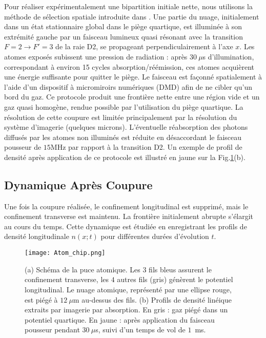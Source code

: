 Pour réaliser expérimentalement une bipartition initiale nette, nous utilisons la méthode de sélection spatiale introduite dans \cite{PhysRevLett.133.113402}. Une partie du nuage, initialement dans un état stationnaire global dans le piège quartique, est illuminée à son extrémité gauche par un faisceau lumineux quasi résonant avec la transition $F=2 \rightarrow F'=3$ de la raie D2, se propageant perpendiculairement à l’axe $x$. Les atomes exposés subissent une pression de radiation : après $30~\mu$s d’illumination, correspondant à environ 15 cycles absorption/réémission, ces atomes acquièrent une énergie suffisante pour quitter le piège. Le faisceau est façonné spatialement à l’aide d’un dispositif à micromiroirs numériques (DMD) afin de ne cibler qu’un bord du gaz. Ce protocole produit une frontière nette entre une région vide et un gaz quasi homogène, rendue possible par l’utilisation du piège quartique. La résolution de cette coupure est limitée principalement par la résolution du système d’imagerie (quelques microns). L’éventuelle réabsorption des photons diffusés par les atomes non illuminés est réduite en désaccordant le faisceau pousseur de $15$MHz par rapport à la transition D2. Un exemple de profil de densité après application de ce protocole est illustré en jaune sur la Fig.\ref{fig:setup}(b).


\subsection{Dynamique Après Coupure}
Une fois la coupure réalisée, le confinement longitudinal est supprimé, mais le confinement transverse est maintenu. La frontière initialement abrupte s’élargit au cours du temps. Cette dynamique est étudiée en enregistrant les profils de densité longitudinale $n(x;t)$ pour différentes durées d’évolution $t$.

\begin{figure}[!htb]
\centering
\texttt{[image: Atom\_chip.png]}
\caption{(a) Schéma de la puce atomique. Les $3$ fils bleus assurent le confinement transverse, les $4$ autres fils (gris) génèrent le potentiel longitudinal. Le nuage atomique, représenté par une ellipse rouge, est piégé à $12~\mu$m au-dessus des fils. (b) Profils de densité linéique extraits par imagerie par absorption. En gris : gaz piégé dans un potentiel quartique. En jaune : après application du faisceau pousseur pendant $30~\mu$s, suivi d’un temps de vol de $1$~ms.}
\label{fig:setup}
\end{figure}
